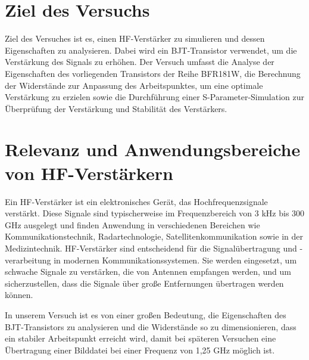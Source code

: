     \section{Ziel des Versuchs}
    Ziel des Versuches ist es, einen HF-Verstärker zu simulieren und dessen Eigenschaften zu analysieren. Dabei wird ein BJT-Transistor verwendet, um die Verstärkung des Signals zu erhöhen. 
    Der Versuch umfasst die Analyse der Eigenschaften des vorliegenden Transistors der Reihe BFR181W, die Berechnung der Widerstände zur Anpassung des Arbeitspunktes, 
    um eine optimale Verstärkung zu erzielen sowie die Durchführung einer S-Parameter-Simulation zur Überprüfung der Verstärkung und Stabilität des Verstärkers.
    \section{Relevanz und Anwendungsbereiche von HF-Verstärkern}
    Ein HF-Verstärker ist ein elektronisches Gerät, das Hochfrequenzsignale verstärkt. Diese Signale sind typischerweise im Frequenzbereich von 3 kHz bis 300 GHz ausgelegt und finden Anwendung in verschiedenen Bereichen wie Kommunikationstechnik, Radartechnologie, Satellitenkommunikation sowie in der Medizintechnik.
    HF-Verstärker sind entscheidend für die Signalübertragung und -verarbeitung in modernen Kommunikationssystemen. Sie werden eingesetzt, um schwache Signale zu verstärken, die von Antennen empfangen werden, und um sicherzustellen, dass die Signale über große Entfernungen übertragen werden können.

    In unserem Versuch ist es von einer großen Bedeutung, die Eigenschaften des BJT-Transistors zu analysieren und die Widerstände so zu dimensionieren, dass ein stabiler Arbeitspunkt erreicht wird, damit bei späteren Versuchen eine Übertragung einer Bilddatei bei einer Frequenz von 1{,}25 GHz möglich ist.
\clearpage
